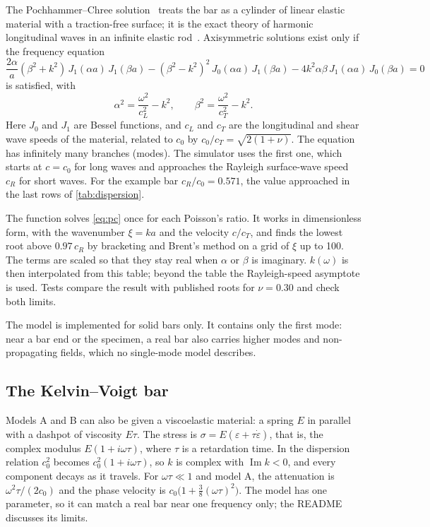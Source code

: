 \documentclass[11pt,a4paper,numbers=noenddot,abstract=true]{scrartcl}
\newcommand{\code}[1]{\texttt{\detokenize{#1}}}
\DeclareMathOperator{\Imag}{Im}
\begin{document}
The Pochhammer--Chree solution~\cite{pochhammer1876, chree1889} treats the bar as a cylinder of linear elastic
material with a traction-free surface; it is the exact theory of harmonic longitudinal waves in an infinite
elastic rod~\cite{graff1975}. Axisymmetric solutions exist only if the frequency equation
\begin{equation}
  \frac{2\alpha}{a}(\beta^2 + k^2)\, J_1(\alpha a)\, J_1(\beta a)
  - (\beta^2 - k^2)^2\, J_0(\alpha a)\, J_1(\beta a)
  - 4 k^2 \alpha\beta\, J_1(\alpha a)\, J_0(\beta a) = 0
  \label{eq:pc}
\end{equation}
is satisfied, with
\begin{equation}
  \alpha^2 = \frac{\omega^2}{c_L^2} - k^2, \qquad \beta^2 = \frac{\omega^2}{c_T^2} - k^2.
\end{equation}
Here $J_0$ and $J_1$ are Bessel functions, and $c_L$ and $c_T$ are the longitudinal and shear wave speeds of the
material, related to $c_0$ by $c_0 / c_T = \sqrt{2(1 + \nu)}$. The equation has infinitely many branches (modes).
The simulator uses the first one, which starts at $c = c_0$ for long waves and approaches the Rayleigh
surface-wave speed $c_R$ for short waves. For the example bar $c_R / c_0 = 0.571$, the value approached in the last
rows of \cref{tab:dispersion}.

The function \code{pc_first_mode_table} solves \cref{eq:pc} once for each Poisson's ratio. It works in
dimensionless form, with the wavenumber $\xi = ka$ and the velocity $c / c_T$, and finds the lowest root above
$0.97\, c_R$ by bracketing and Brent's method on a grid of $\xi$ up to 100. The terms are scaled so that they stay
real when $\alpha$ or $\beta$ is imaginary. $k(\omega)$ is then interpolated from this table; beyond the table the
Rayleigh-speed asymptote is used. Tests compare the result with published roots for $\nu = 0.30$ and check both
limits.

The model is implemented for solid bars only. It contains only the first mode: near a bar end or the specimen, a
real bar also carries higher modes and non-propagating fields, which no single-mode model describes.

\subsection{The Kelvin--Voigt bar}

Models A and B can also be given a viscoelastic material: a spring $E$ in parallel with a dashpot of viscosity
$E\tau$. The stress is $\sigma = E(\varepsilon + \tau\dot\varepsilon)$, that is, the complex modulus
$E(1 + i\omega\tau)$, where $\tau$ is a retardation time. In the dispersion relation $c_0^2$ becomes
$c_0^2 (1 + i\omega\tau)$, so $k$ is complex with $\Imag k < 0$, and every component decays as it travels. For
$\omega\tau \ll 1$ and model A, the attenuation is $\omega^2\tau / (2c_0)$ and the phase velocity is
$c_0\bigl(1 + \tfrac{3}{8}(\omega\tau)^2\bigr)$. The model has one parameter, so it can match a real bar near one
frequency only; the README discusses its limits.
\end{document}
